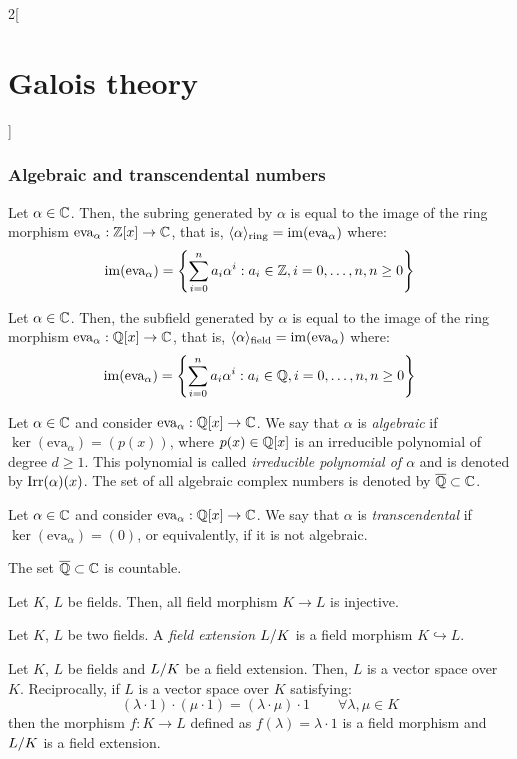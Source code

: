 \documentclass[../../../main.tex]{subfiles}
\begin{document}
\begin{multicols}{2}[\section{Galois theory}]
  \subsubsection*{Algebraic and transcendental numbers}
  \begin{prop}
    Let $\alpha\in\mathbb{C}$. Then, the subring generated by $\alpha$ is equal to the image of the ring morphism $\text{eva}_\alpha:\mathbb{Z}[x]\rightarrow\mathbb{C}$, that is, $\langle\alpha\rangle_\text{ring}=\operatorname{im}(\text{eva}_\alpha)$ where: $$\operatorname{im}(\text{eva}_\alpha)=\left\{\sum_{i=0}^na_i\alpha^i:a_i\in\mathbb{Z},i=0,\ldots, n,n\geq 0\right\}$$
  \end{prop}
  \begin{prop}
    Let $\alpha\in\mathbb{C}$. Then, the subfield generated by $\alpha$ is equal to the image of the ring morphism $\text{eva}_\alpha:\mathbb{Q}[x]\rightarrow\mathbb{C}$, that is, $\langle\alpha\rangle_\text{field}=\operatorname{im}(\text{eva}_\alpha)$ where: $$\operatorname{im}(\text{eva}_\alpha)=\left\{\sum_{i=0}^na_i\alpha^i:a_i\in\mathbb{Q},i=0,\ldots, n,n\geq 0\right\}$$
  \end{prop}
  \begin{definition}
    Let $\alpha\in\mathbb{C}$ and consider $\text{eva}_\alpha:\mathbb{Q}[x]\rightarrow\mathbb{C}$. We say that $\alpha$ is \textit{algebraic} if $\ker(\text{eva}_\alpha)=(p(x))$, where $p(x)\in\mathbb{Q}[x]$ is an irreducible polynomial of degree $d\geq 1$. This polynomial is called \textit{irreducible polynomial of $\alpha$} and is denoted by $\operatorname{Irr}(\alpha)(x)$. The set of all algebraic complex numbers is denoted by $\overline{\mathbb{Q}}\subset\mathbb{C}$.
  \end{definition}
  \begin{definition}
    Let $\alpha\in\mathbb{C}$ and consider $\text{eva}_\alpha:\mathbb{Q}[x]\rightarrow\mathbb{C}$. We say that $\alpha$ is \textit{transcendental} if $\ker(\text{eva}_\alpha)=(0)$, or equivalently, if it is not algebraic.
  \end{definition}
  \begin{theorem}
    The set $\overline{\mathbb{Q}}\subset\mathbb{C}$ is countable.
  \end{theorem}
  \begin{prop}
    Let $K$, $L$ be fields. Then, all field morphism $K\rightarrow L$ is injective.
  \end{prop}
  \begin{definition}
    Let $K$, $L$ be two fields. A \textit{field extension $\quot{L}{K}$} is a field morphism $K\hookrightarrow L$.
  \end{definition}
  \begin{prop}
    Let $K$, $L$ be fields and $\quot{L}{K}$ be a field extension. Then, $L$ is a vector space over $K$. Reciprocally, if $L$ is a vector space over $K$ satisfying: $$(\lambda\cdot 1)\cdot(\mu\cdot 1)=(\lambda\cdot\mu)\cdot 1\qquad\forall\lambda,\mu\in K$$ then the morphism $f:K\rightarrow L$ defined as $f(\lambda)=\lambda\cdot 1$ is a field morphism and $\quot{L}{K}$ is a field extension.

\end{prop}
\end{multicols}
\end{document}
